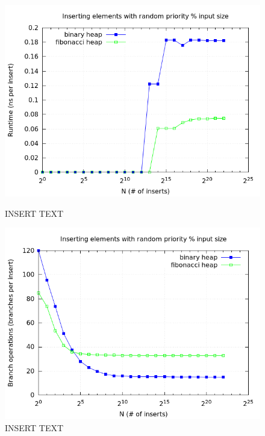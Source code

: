 \documentclass[a4paper,oneside,article,11pt]{memoir}
\begin{document}
\begin{figure}[H]
\centering
\begin{minipage}{0.48\columnwidth}
  \centering
  \includegraphics[width=\linewidth]{../res/inserts/insert_random_time_small.png}%
  \caption{INSERT TEXT}
  \label{fig:insert_t_random_small}
\end{minipage}%
\hfill
\begin{minipage}{0.48\columnwidth}
  \centering
  \includegraphics[width=\linewidth]{../res/inserts/insert_random_branch_small.png}%
  \caption{INSERT TEXT}
  \label{fig:insert_b_random_small}
\end{minipage}
\end{figure}
\end{document}

